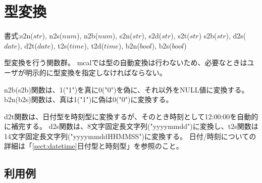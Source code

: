 
%

\section{型変換\label{sect:cast}}

書式:s2n($str$), n2s($num$), n2b($num$), s2n($str$), s2d($str$), s2t($str$)
s2b($str$), d2s($date$), d2t($date$), t2s($time$), t2d($time$), b2n($bool$), b2s($bool$)

型変換を行う関数群。
mcalでは型の自動変換は行わないため、必要なときはユーザが明示的に型変換を指定しなければならない。

n2b(s2b)関数は、1("1")を真に0("0")を偽に、それ以外をNULL値に変換する。
b2n(b2s)関数は、真は1("1")に偽は0("0")に変換する。

d2t関数は、日付型を時刻型に変換するが、そのとき時刻として12:00:00を自動的に補完する。
d2s関数は、8文字固定長文字列("yyyymmdd")に変換し、t2s関数は14文字固定長文字列("yyyymmddHHMMSS")に変換する。
日付/時刻についての詳細は「\ref{sect:datetime}日付型と時刻型」を参照のこと。

\subsection*{利用例}


%

